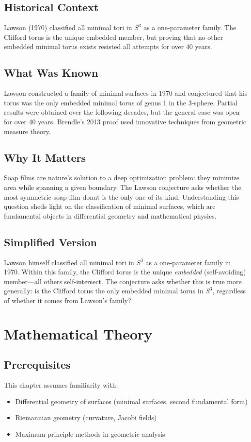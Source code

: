 \subsection{Historical Context}
Lawson (1970) classified all minimal tori in $S^3$ as a one-parameter family. The Clifford torus is the unique embedded member, but proving that no other embedded minimal torus exists resisted all attempts for over 40 years.

\subsection{What Was Known}
Lawson constructed a family of minimal surfaces in 1970 and conjectured that his torus was the only embedded minimal torus of genus 1 in the 3-sphere. Partial results were obtained over the following decades, but the general case was open for over 40 years. Brendle's 2013 proof used innovative techniques from geometric measure theory.

\subsection{Why It Matters}
Soap films are nature's solution to a deep optimization problem: they minimize area while spanning a given boundary. The Lawson conjecture asks whether the most symmetric soap-film donut is the only one of its kind. Understanding this question sheds light on the classification of minimal surfaces, which are fundamental objects in differential geometry and mathematical physics.

\subsection{Simplified Version}
Lawson himself classified all minimal tori in $S^3$ as a one-parameter family in 1970. Within this family, the Clifford torus is the unique \emph{embedded} (self-avoiding) member---all others self-intersect. The conjecture asks whether this is true more generally: is the Clifford torus the only embedded minimal torus in $S^3$, regardless of whether it comes from Lawson's family?

\section{Mathematical Theory}


\subsection{Prerequisites}
This chapter assumes familiarity with:
\begin{itemize}
\item Differential geometry of surfaces (minimal surfaces, second fundamental form)
\item Riemannian geometry (curvature, Jacobi fields)
\item Maximum principle methods in geometric analysis
\end{itemize}

